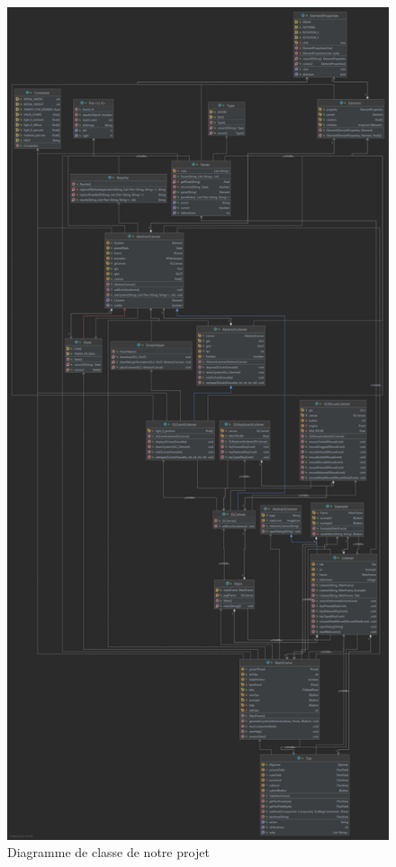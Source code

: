 \begin{figure}[h!]
    \centering
    \includegraphics[width=0.7\linewidth]{pics/diagram.png}
    \caption{Diagramme de classe de notre projet}
    \label{fig:class_diagram}
\end{figure}

